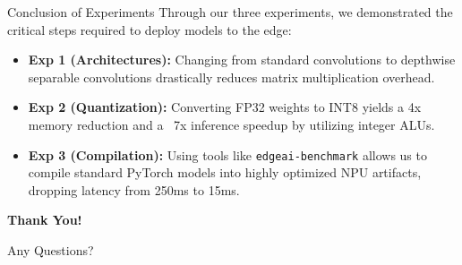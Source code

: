 \documentclass[aspectratio=169]{beamer}
\begin{document}
\begin{frame}{Conclusion of Experiments}
    Through our three experiments, we demonstrated the critical steps required to deploy models to the edge:
    
    \vspace{0.3cm}
    \begin{itemize}
        \item \textbf{Exp 1 (Architectures):} Changing from standard convolutions to depthwise separable convolutions drastically reduces matrix multiplication overhead.
        \item \textbf{Exp 2 (Quantization):} Converting FP32 weights to INT8 yields a 4x memory reduction and a ~7x inference speedup by utilizing integer ALUs.
        \item \textbf{Exp 3 (Compilation):} Using tools like \texttt{edgeai-benchmark} allows us to compile standard PyTorch models into highly optimized NPU artifacts, dropping latency from 250ms to 15ms.
    \end{itemize}
\end{frame}

\begin{frame}
    \begin{center}
        \Huge \textbf{Thank You!}

        \vspace{1cm}
        \Large Any Questions?
    \end{center}
\end{frame}
\end{document}
